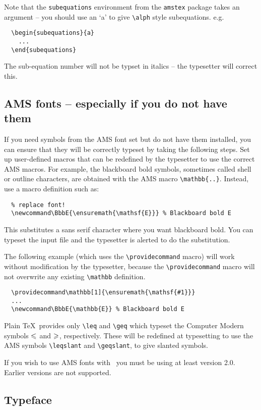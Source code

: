 \documentclass{jfm}
\newcommand\eg{e.g.\ }
\begin{document}
Note that the \verb"subequations" environment from the \verb"amstex" package
takes an argument -- you should use an `a' to give \verb"\alph" style
subequations. \eg
\begin{verbatim}
  \begin{subequations}{a}
    ...
  \end{subequations}
\end{verbatim}
The sub-equation number will not be typset in italics -- the typesetter
will correct this.

\subsection{AMS fonts -- especially if you do not have them}

If you need symbols from the AMS font set but do not have them installed,
you can ensure that they will be correctly typeset by taking the following
steps.
Set up user-defined macros that can be redefined by the typesetter to use
the correct AMS macros. For example, the blackboard bold symbols,
sometimes called shell or outline characters, are obtained with the AMS
macro \verb"\mathbb{..}". Instead, use a macro definition such as:
%
\begin{verbatim}
  % replace font!
  \newcommand\BbbE{\ensuremath{\mathsf{E}}} % Blackboard bold E
\end{verbatim}
%
This substitutes a sans serif character where you want blackboard
bold. You can typeset the input file and the typesetter is alerted to do the
substitution.

The following example (which uses the \verb"\providecommand" macro) will work
without modification by the typesetter, because the \verb"\providecommand"
macro will not overwrite any existing \verb"\mathbb" definition.
%
\begin{verbatim}
  \providecommand\mathbb[1]{\ensuremath{\mathsf{#1}}}
  ...
  \newcommand\BbbE{\mathbb{E}} % Blackboard bold E
\end{verbatim}

Plain \TeX\ provides only \verb"\leq" and \verb"\geq" which typeset the
Computer Modern symbols $\realleq$ and $\realgeq$, respectively. These will
be redefined at typesetting to use the AMS symbols \verb"\leqslant" and
\verb"\geqslant", to give slanted symbols.

If you wish to use AMS fonts with \LaTeXe\ you must be using at least
version 2.0. Earlier versions are not supported.

\subsection{Typeface}
\end{document}
